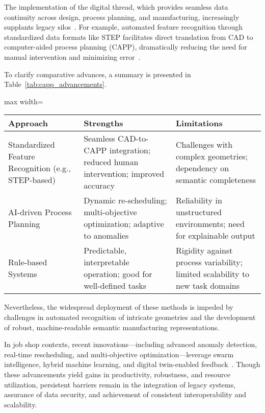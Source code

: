 \documentclass[sigconf]{acmart}
\begin{document}
The implementation of the digital thread, which provides seamless data continuity across design, process planning, and manufacturing, increasingly supplants legacy silos~\cite{ref11,ref51}. For example, automated feature recognition through standardized data formats like STEP facilitates direct translation from CAD to computer-aided process planning (CAPP), dramatically reducing the need for manual intervention and minimizing error~\cite{ref51}.

To clarify comparative advances, a summary is presented in Table~\ref{tab:capp_advancements}.

\begin{table*}[htbp]
\centering
\caption{Comparative Advances in Automated Process Planning}
\label{tab:capp_advancements}
\begin{adjustbox}{max width=\textwidth}
\begin{tabular}{lll}
\toprule
\textbf{Approach} & \textbf{Strengths} & \textbf{Limitations} \\
\midrule
Standardized Feature Recognition (e.g., STEP-based) & Seamless CAD-to-CAPP integration; reduced human intervention; improved accuracy & Challenges with complex geometries; dependency on semantic completeness \\
AI-driven Process Planning & Dynamic re-scheduling; multi-objective optimization; adaptive to anomalies & Reliability in unstructured environments; need for explainable output \\
Rule-based Systems & Predictable, interpretable operation; good for well-defined tasks & Rigidity against process variability; limited scalability to new task domains \\
\bottomrule
\end{tabular}
\end{adjustbox}
\end{table*}

Nevertheless, the widespread deployment of these methods is impeded by challenges in automated recognition of intricate geometries and the development of robust, machine-readable semantic manufacturing representations.

In job shop contexts, recent innovations—including advanced anomaly detection, real-time rescheduling, and multi-objective optimization—leverage swarm intelligence, hybrid machine learning, and digital twin-enabled feedback~\cite{ref19,ref27,ref38,ref44}. Though these advancements yield gains in productivity, robustness, and resource utilization, persistent barriers remain in the integration of legacy systems, assurance of data security, and achievement of consistent interoperability and scalability.
\end{document}
